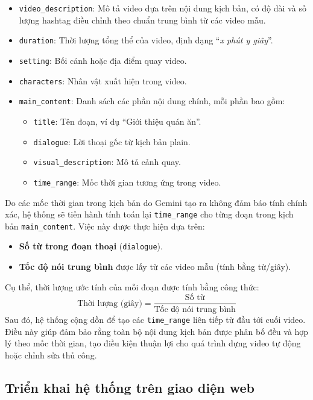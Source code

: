 \begin{itemize}
    \item \texttt{video\_description}: Mô tả video dựa trên nội dung kịch bản, có độ dài và số lượng hashtag điều chỉnh theo chuẩn trung bình từ các video mẫu.
    \item \texttt{duration}: Thời lượng tổng thể của video, định dạng ``\textit{x phút y giây}''.
    \item \texttt{setting}: Bối cảnh hoặc địa điểm quay video.
    \item \texttt{characters}: Nhân vật xuất hiện trong video.
    \item \texttt{main\_content}: Danh sách các phần nội dung chính, mỗi phần bao gồm:
    \begin{itemize}
        \item \texttt{title}: Tên đoạn, ví dụ ``Giới thiệu quán ăn''.
        \item \texttt{dialogue}: Lời thoại gốc từ kịch bản plain.
        \item \texttt{visual\_description}: Mô tả cảnh quay.
        \item \texttt{time\_range}: Mốc thời gian tương ứng trong video.
    \end{itemize}
\end{itemize}

Do các mốc thời gian trong kịch bản do Gemini tạo ra không đảm báo tính chính xác, hệ thống sẽ tiến hành tính toán lại \texttt{time\_range} cho từng đoạn trong kịch bản \texttt{main\_content}. Việc này được thực hiện dựa trên:
\begin{itemize}
    \item \textbf{Số từ trong đoạn thoại} (\texttt{dialogue}).
    \item \textbf{Tốc độ nói trung bình} được lấy từ các video mẫu (tính bằng từ/giây).
\end{itemize}

Cụ thể, thời lượng ước tính của mỗi đoạn được tính bằng công thức:
\[
\text{Thời lượng (giây)} = \frac{\text{Số từ}}{\text{Tốc độ nói trung bình}}
\]
Sau đó, hệ thống cộng dồn để tạo các \texttt{time\_range} liên tiếp từ đầu tới cuối video. Điều này giúp đảm bảo rằng toàn bộ nội dung kịch bản được phân bố đều và hợp lý theo mốc thời gian, tạo điều kiện thuận lợi cho quá trình dựng video tự động hoặc chỉnh sửa thủ công.

\subsection{Triển khai hệ thống trên giao diện web}

